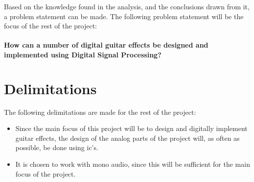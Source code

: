 Based on the knowledge found in the analysis, and the conclusions drawn from it, a problem statement can be made. The following problem statement will be the focus of the rest of the project:
\\
\\
\textbf{How can a number of digital guitar effects be designed and implemented using Digital Signal Processing?}
\section{Delimitations}
The following delimitations are made for the rest of the project:

\begin{itemize}
\item Since the main focus of this project will be to design and digitally implement guitar effects, the design of the analog parts of the project will, as often as possible, be done using \gls{ic}'s. 
\item It is chosen to work with mono audio, since this will be sufficient for the main focus of the project.
\end{itemize} 
 